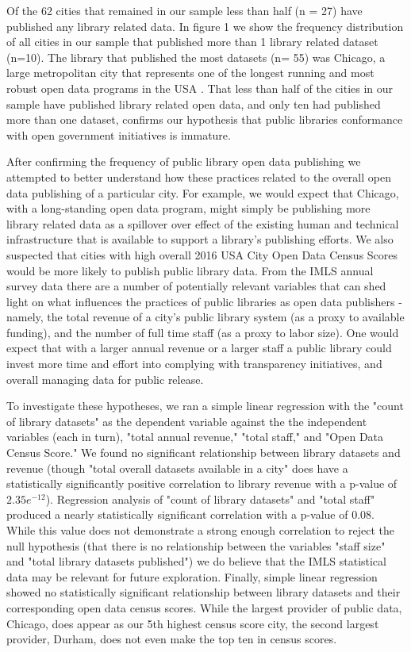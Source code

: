 \documentclass[sigconf]{acmart}
\begin{document}
Of the 62 cities that remained in our sample less than half (n = 27) have published any library related data. In figure 1 we show the frequency distribution of all cities in our sample that published more than 1 library related dataset (n=10). The library that published the most datasets (n= 55) was Chicago, a large metropolitan city that represents one of the longest running and most robust open data programs in the USA \cite{kassen2013promising}. That less than half of the cities in our sample have published library related open data, and only ten had published more than one dataset, confirms our hypothesis that public libraries conformance with open government initiatives is immature.

After confirming the frequency of public library open data publishing we attempted to better understand how these practices related to the overall open data publishing of a particular city. For example, we would expect that Chicago, with a long-standing open data program, might simply be publishing more library related data as a spillover over effect of  the existing human and technical infrastructure that is available to support a library's publishing efforts. We also suspected that cities with high overall 2016 USA City Open Data Census Scores would be more likely to publish public library data. From the IMLS annual survey data there are a number of potentially relevant variables that can shed light on what influences the practices of public libraries as open data publishers - namely,  the total revenue of a city's public library system (as a proxy to available funding), and the number of full time staff (as a proxy to labor size). One would expect that with a larger annual revenue or a larger staff a public library could invest more time and effort into complying with transparency initiatives, and overall managing data for public release.

To investigate these hypotheses, we ran a simple linear regression with the "count of library datasets" as the dependent variable against the the independent variables (each in turn), "total annual revenue," "total staff," and "Open Data Census Score." We found no significant relationship between library datasets and revenue (though "total overall datasets available in a city" does have a statistically significantly positive correlation to library revenue with a p-value of $2.35e^{-12}$). Regression analysis of "count of library datasets" and  "total staff" produced a nearly statistically significant correlation with a p-value of 0.08. While this value does not demonstrate a strong enough correlation to reject the null hypothesis (that there is no relationship between the variables "staff size" and "total library datasets published") we do believe that the IMLS statistical data may be relevant for future exploration. Finally, simple linear regression showed no statistically significant relationship between library datasets and their corresponding open data census scores. While the largest provider of public data, Chicago, does appear as our 5th highest census score city, the second largest provider, Durham, does not even make the top ten in census scores.
\end{document}
